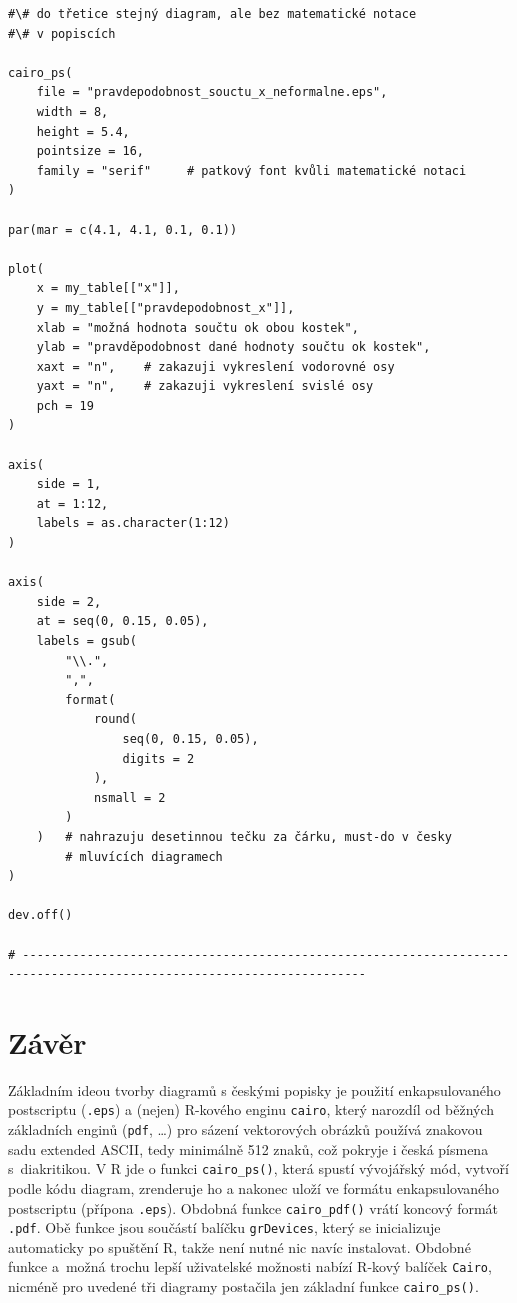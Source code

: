\documentclass{article}
\begin{document}
\begin{lstlisting}[style = custom_R]
#\# do třetice stejný diagram, ale bez matematické notace
#\# v popiscích

cairo_ps(
    file = "pravdepodobnost_souctu_x_neformalne.eps",
    width = 8,
    height = 5.4,
    pointsize = 16,
    family = "serif"     # patkový font kvůli matematické notaci
)

par(mar = c(4.1, 4.1, 0.1, 0.1))

plot(
    x = my_table[["x"]],
    y = my_table[["pravdepodobnost_x"]],
    xlab = "možná hodnota součtu ok obou kostek",
    ylab = "pravděpodobnost dané hodnoty součtu ok kostek",
    xaxt = "n",    # zakazuji vykreslení vodorovné osy
    yaxt = "n",    # zakazuji vykreslení svislé osy
    pch = 19
)

axis(
    side = 1,
    at = 1:12,
    labels = as.character(1:12)
)

axis(
    side = 2,
    at = seq(0, 0.15, 0.05),
    labels = gsub(
        "\\.",
        ",",
        format(
            round(
                seq(0, 0.15, 0.05),
                digits = 2
            ),
            nsmall = 2
        )
    )   # nahrazuju desetinnou tečku za čárku, must-do v česky
        # mluvících diagramech
)

dev.off()

# ----------------------------------------------------------------------------------------------------------------------
\end{lstlisting}

\section{Závěr}

Základním ideou tvorby diagramů s českými popisky je použití
enkapsulovaného postscriptu (\texttt{.eps}) a (nejen) \textsf{R}-kového
enginu \texttt{cairo}, který narozdíl od běžných základních enginů
(\texttt{pdf}, \ldots)
pro sázení vektorových obrázků používá znakovou sadu extended ASCII,
tedy minimálně 512 znaků, což pokryje i česká písmena s~diakritikou.
V \textsf{R} jde o funkci \texttt{cairo\_ps()}, která spustí vývojářský
mód, vytvoří podle kódu diagram, zrenderuje ho a nakonec uloží ve formátu
enkapsulovaného postscriptu (přípona \texttt{.eps}).
Obdobná funkce \texttt{cairo\_pdf()} vrátí koncový formát \texttt{.pdf}.
Obě funkce jsou součástí balíčku \texttt{grDevices}, který se inicializuje
automaticky po spuštění \textsf{R}, takže není nutné nic navíc instalovat.
Obdobné funkce a~možná trochu lepší uživatelské možnosti nabízí
\textsf{R}-kový balíček \texttt{Cairo}, nicméně pro uvedené tři diagramy
postačila jen základní funkce \texttt{cairo\_ps()}.
\end{document}

